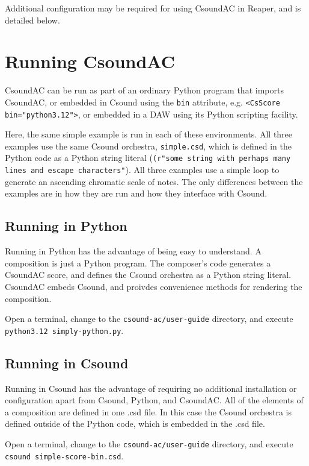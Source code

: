 \documentclass[letterpaper,10pt]{scrartcl}
\begin{document}
Additional configuration may be required for using CsoundAC in Reaper, and is detailed below.

\section{Running CsoundAC}

CsoundAC can be run as part of an ordinary Python program that imports CsoundAC, or embedded in Csound using the \texttt{bin} attribute, e.g. \lstinline|<CsScore bin="python3.12">|, or embedded in a DAW using its Python scripting facility. 

Here, the same simple example is run in each of these environments. All three examples use the same Csound orchestra, \lstinline|simple.csd|, which is defined in the Python code as a Python string literal (\lstinline|(r"some string with perhaps many lines and escape characters"|). All three examples use a simple loop to generate an ascending chromatic scale of notes. The only differences between the examples are in how they are run and how they interface with Csound.

\subsection{Running in Python}

Running in Python has the advantage of being easy to understand. A composition is just a Python program. The composer's code generates a CsoundAC score, and defines the Csound orchestra as a Python string literal. CsoundAC embeds Csound, and proivdes convenience methods for rendering the composition.

Open a terminal, change to the \lstinline|csound-ac/user-guide| directory, and execute \lstinline|python3.12 simply-python.py|.

\subsection{Running in Csound}

Running in Csound has the advantage of requiring no additional installation or configuration apart from Csound, Python, and CsoundAC. All of the elements of a composition are defined in one .csd file. In this case the Csound orchestra is defined outside of the Python code, which is embedded in the .csd file.

Open a terminal, change to the \lstinline|csound-ac/user-guide| directory, and execute \lstinline|csound simple-score-bin.csd|.
\end{document}
